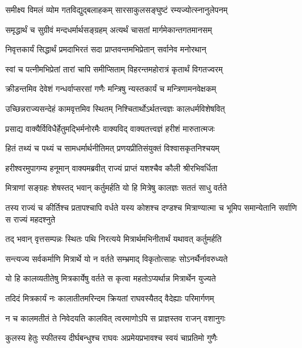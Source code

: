 
\twolineshloka
{समीक्ष्य विमलं व्योम गतविद्युद्बलाहकम्}
{सारसाकुलसङ्घुष्टं रम्यज्योत्स्नानुलेपनम्} %

\twolineshloka
{समृद्धार्थं च सुग्रीवं मन्दधर्मार्थसङ्ग्रहम्}
{अत्यर्थं चासतां मार्गमेकान्तगतमानसम्} %

\twolineshloka
{निवृत्तकार्यं सिद्धार्थं प्रमदाभिरतं सदा}
{प्राप्तवन्तमभिप्रेतान् सर्वानेव मनोरथान्} %

\twolineshloka
{स्वां च पत्नीमभिप्रेतां तारां चापि समीप्सिताम्}
{विहरन्तमहोरात्रं कृतार्थं विगतज्वरम्} %

\twolineshloka
{क्रीडन्तमिव देवेशं गन्धर्वाप्सरसां गणैः}
{मन्त्रिषु न्यस्तकार्यं च मन्त्रिणामनवेक्षकम्} %

\twolineshloka
{उच्छिन्नराज्यसन्देहं कामवृत्तमिव स्थितम्}
{निश्चितार्थोऽर्थतत्त्वज्ञः कालधर्मविशेषवित्} %

\twolineshloka
{प्रसाद्य वाक्यैर्विविधैर्हेतुमद्भिर्मनोरमैः}
{वाक्यविद् वाक्यतत्त्वज्ञं हरीशं मारुतात्मजः} %

\twolineshloka
{हितं तथ्यं च पथ्यं च सामधर्मार्थनीतिमत्}
{प्रणयप्रीतिसंयुक्तं विश्वासकृतनिश्चयम्} %

\twolineshloka
{हरीश्वरमुपागम्य हनूमान् वाक्यमब्रवीत्}
{राज्यं प्राप्तं यशश्चैव कौली श्रीरभिवर्धिता} %

\twolineshloka
{मित्राणां सङ्ग्रहः शेषस्तद् भवान् कर्तुमर्हति}
{यो हि मित्रेषु कालज्ञः सततं साधु वर्तते} %

\threelineshloka
{तस्य राज्यं च कीर्तिश्च प्रतापश्चापि वर्धते}
{यस्य कोशश्च दण्डश्च मित्राण्यात्मा च भूमिप}
{समान्येतानि सर्वाणि स राज्यं महदश्नुते} %

\twolineshloka
{तद् भवान् वृत्तसम्पन्नः स्थितः पथि निरत्यये}
{मित्रार्थमभिनीतार्थं यथावत् कर्तुमर्हति} %

\twolineshloka
{सन्त्यज्य सर्वकर्माणि मित्रार्थे यो न वर्तते}
{सम्भ्रमाद् विकृतोत्साहः सोऽनर्थैर्नावरुध्यते} %

\twolineshloka
{यो हि कालव्यतीतेषु मित्रकार्येषु वर्तते}
{स कृत्वा महतोऽप्यर्थान्न मित्रार्थेन युज्यते} %

\twolineshloka
{तदिदं मित्रकार्यं नः कालातीतमरिन्दम}
{क्रियतां राघवस्यैतद् वैदेह्याः परिमार्गणम्} %

\twolineshloka
{न च कालमतीतं ते निवेदयति कालवित्}
{त्वरमाणोऽपि स प्राज्ञस्तव राजन् वशानुगः} %

\twolineshloka
{कुलस्य हेतुः स्फीतस्य दीर्घबन्धुश्च राघवः}
{अप्रमेयप्रभावश्च स्वयं चाप्रतिमो गुणैः} %

